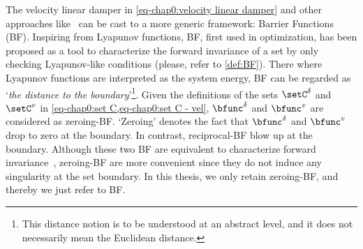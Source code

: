 The velocity linear damper in \cref{eq-chap0:velocity linear damper} and other approaches like~\cite{quiroz-omana2019ral} can be cast to a more generic framework: Barrier Functions (BF). Inspiring from Lyapunov functions, BF, first used in optimization, has been proposed as a tool to characterize the forward invariance of a set by only checking  Lyapunov-like conditions (please, refer to \cref{def:BF}). There where Lyapunov functions are interpreted as the system energy, BF can be regarded as ‘\emph{the distance to the boundary}’\footnote{This distance notion is to be understood at an abstract level, and it does not necessarily mean the Euclidean distance.}. Given the definitions of the sets $\setC^{\delta}$ and $\setC^v$ in \cref{eq-chap0:set C,eq-chap0:set C - vel}, $\bfunc^{\delta}$ and $\bfunc^{v}$ are considered as zeroing-BF. ‘Zeroing’  denotes the fact that  $\bfunc^{\delta}$ and $\bfunc^{v}$ drop to zero at the boundary. In contrast, reciprocal-BF blow up at the boundary. %
Although these two BF are equivalent to characterize forward invariance~\cite[Theorem~2]{ames2017tac}, zeroing-BF are more convenient since they do not induce any singularity at the set boundary. In this thesis, we only retain zeroing-BF, and thereby we just refer to BF.  

